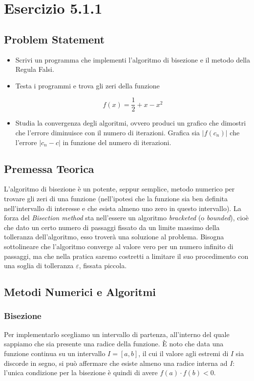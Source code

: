 
\section{Esercizio 5.1.1}
\subsection{Problem Statement}
\begin{itemize}
    \item Scrivi un programma che implementi l'algoritmo di bisezione e il metodo della Regula Falsi.
    \item Testa i programmi e trova gli zeri della funzione
    
    \[
    f(x) = \frac{1}{2} + x - x^2
    \]
    
    \item Studia la convergenza degli algoritmi, ovvero produci un grafico che dimostri che l'errore diminuisce con il numero di iterazioni. Grafica sia $|f(c_n)|$ che l'errore $|c_n - c|$ in funzione del numero di iterazioni.
\end{itemize}

\subsection{Premessa Teorica}
L'algoritmo di bisezione è un potente, seppur semplice, metodo numerico per trovare gli zeri di una funzione (nell'ipotesi che la funzione sia ben definita nell'intervallo di interesse e che esista almeno uno zero in questo intervallo). La forza del \textit{Bisection method} sta nell'essere un algoritmo \textit{bracketed} (o \textit{bounded}), cioè che dato un certo numero di passaggi fissato da un limite massimo della tolleranza dell'algoritmo, esso troverà una soluzione al problema. Bisogna sottolineare che l'algoritmo converge al valore vero per un numero infinito di passaggi, ma che nella pratica saremo costretti a limitare il suo procedimento con una soglia di tolleranza $\varepsilon$, fissata piccola.


\subsection{Metodi Numerici e Algoritmi} \label{sec. bisec e Regula Falsi}
\subsubsection{Bisezione}
Per implementarlo scegliamo un intervallo di partenza, all'interno del quale sappiamo che sia presente una radice della funzione. È noto che data una funzione continua su un intervallo $I= [a,b]$, il cui il valore agli estremi di $I$ sia discorde in segno, si può affermare che esiste almeno una radice interna ad $I$: l'unica condizione per la bisezione è quindi di avere $f(a)\cdot f(b) < 0$.\\

